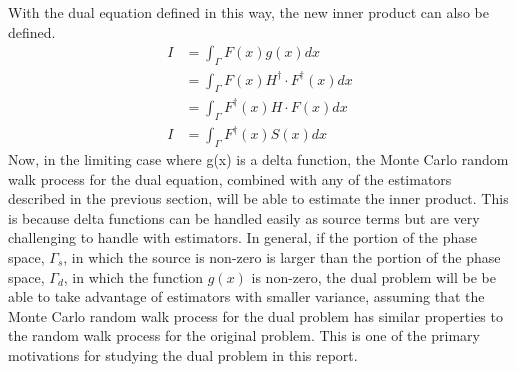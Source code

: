 With the dual equation defined in this way, the new inner product can also
be defined.
\begin{align}
  I & = \int_{\Gamma} F(x)g(x)dx \nonumber \\
  & = \int_{\Gamma} F(x) H^{\dagger} \cdot F^{\dagger}(x)dx \nonumber \\
  & = \int_{\Gamma}  F^{\dagger}(x) H \cdot F(x) dx \nonumber \\
  I & = \int_{\Gamma} F^{\dagger}(x)S(x) dx
\end{align}
Now, in the limiting case where g(x) is a delta function, the Monte Carlo
random walk process for the dual equation, combined with any of the estimators 
described in the previous section, will be able to estimate the inner product. 
This is because delta functions can be handled easily as source terms but
are very challenging to handle with estimators. In general, if the portion of 
the phase space, $\Gamma_s$, in which the source is non-zero is larger than the
portion of the phase space, $\Gamma_d$, in which the function $g(x)$ is 
non-zero, the dual problem will be be able to take advantage of estimators with
smaller variance, assuming that the Monte Carlo random walk process for the
dual problem has similar properties to the random walk process for the original
problem. This is one of the primary motivations for studying the dual problem 
in this report.
